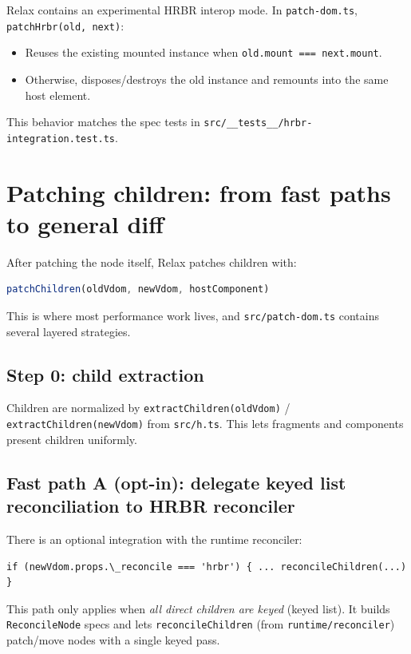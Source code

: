 Relax contains an experimental HRBR interop mode. In \texttt{patch-dom.ts}, \texttt{patchHrbr(old, next)}:

\begin{itemize}
  \item Reuses the existing mounted instance when \texttt{old.mount === next.mount}.
  \item Otherwise, disposes/destroys the old instance and remounts into the same host element.
\end{itemize}

This behavior matches the spec tests in \texttt{src/\_\_tests\_\_/hrbr-integration.test.ts}.

\section{Patching children: from fast paths to general diff}

After patching the node itself, Relax patches children with:

\begin{lstlisting}[language=JavaScript]
patchChildren(oldVdom, newVdom, hostComponent)
\end{lstlisting}

This is where most performance work lives, and \texttt{src/patch-dom.ts} contains several layered strategies.

\subsection{Step 0: child extraction}

Children are normalized by \texttt{extractChildren(oldVdom)} / \texttt{extractChildren(newVdom)} from \texttt{src/h.ts}.
This lets fragments and components present children uniformly.

\subsection{Fast path A (opt-in): delegate keyed list reconciliation to HRBR reconciler}

There is an optional integration with the runtime reconciler:

\begin{verbatim}
if (newVdom.props.\_reconcile === 'hrbr') { ... reconcileChildren(...) }
\end{verbatim}

This path only applies when \emph{all direct children are keyed} (keyed list). It builds \texttt{ReconcileNode} specs and lets \texttt{reconcileChildren} (from \texttt{runtime/reconciler}) patch/move nodes with a single keyed pass.

